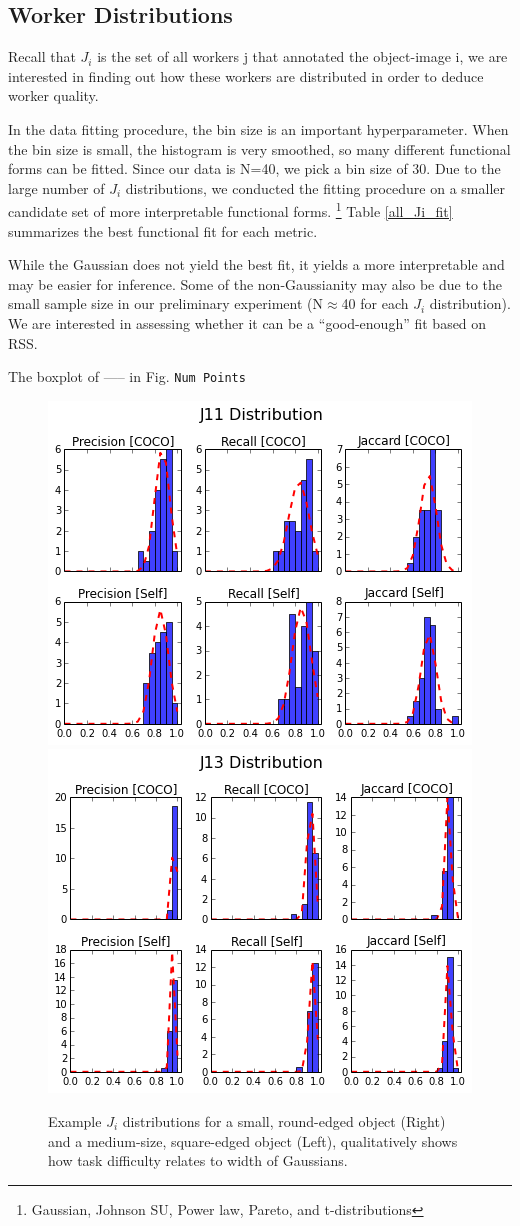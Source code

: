 \documentclass[12pt]{article}
\begin{document}
\subsection{Worker Distributions}
\par Recall that $J_i$  is the set of all workers j that annotated the object-image i, we are interested in finding out how these workers are distributed in order to deduce worker quality. 
\par In the data fitting procedure, the bin size is an important hyperparameter. When the bin size is small, the histogram is very smoothed, so many different functional forms can be fitted. Since our data is N=40, we pick a bin size of 30. Due to the large number of $J_i$ distributions, we conducted the fitting procedure on a smaller candidate set of more interpretable functional forms.
\footnote{Gaussian, Johnson SU, Power law, Pareto, and t-distributions} Table \ref{all_Ji_fit} summarizes the best functional fit for each metric. 
\par While the Gaussian does not yield the best fit, it yields a more interpretable and may be easier for inference. Some of the non-Gaussianity may also be due to the small sample size in our preliminary experiment (N$\approx$40 for each $J_i$ distribution). We are interested in  assessing whether it can be a ``good-enough'' fit based on RSS. 
\par The boxplot of ----- in Fig.
\texttt{Num Points}



\begin{figure}[ht]
\centering
\includegraphics[width=0.47\linewidth]{plots/J11Wide.png}
\includegraphics[width=0.47\linewidth]{plots/J13Narrow.png}
\caption{Example $J_i$ distributions for a small, round-edged object (Right) and a medium-size, square-edged object (Left), qualitatively shows how task difficulty relates to width of Gaussians.}
\end{figure}
\end{document}
